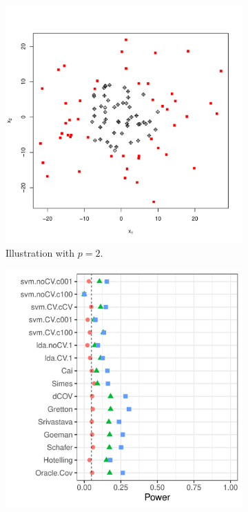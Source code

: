 \documentclass[]{bio}
\begin{document}
\begin{figure}[th]
	\centering
	\begin{subfigure}[t]{.3\columnwidth}
		\centering
		\includegraphics[width=1\linewidth]{art/quadratic-form}
		\caption{Illustration with $p=2$.}
		\label{fig:quadratic-form}
	\end{subfigure}
	\begin{subfigure}[t]{.3\columnwidth}
		\centering
	\includegraphics[width=1\columnwidth]{"art/file42"}

\end{subfigure}
\end{figure}
\end{document}
